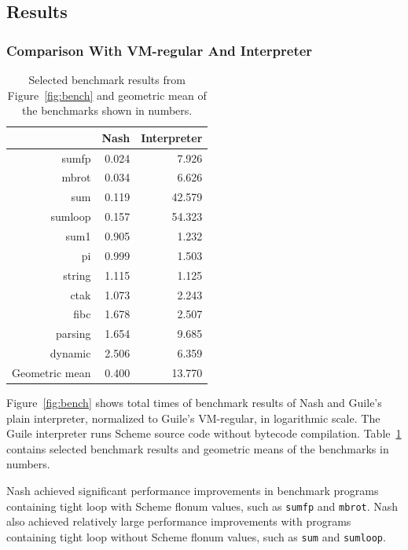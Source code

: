 \documentclass[preprint, 10pt]{sigplanconf}
\begin{document}
\subsection{Results}
\label{sec:results}

\subsubsection{Comparison With VM-regular And Interpreter}
\label{sec:guilecomp}

\begin{table}
  \centering
  \begin{tabular}{rrr}
     & Nash & Interpreter \\
    \toprule
    sumfp & 0.024 & 7.926 \\
    mbrot & 0.034 & 6.626 \\
    sum & 0.119 & 42.579 \\
    sumloop & 0.157 & 54.323 \\
    \midrule
    sum1 & 0.905 & 1.232 \\
    pi & 0.999 & 1.503 \\
    string & 1.115 & 1.125 \\
    \midrule
    ctak & 1.073 & 2.243 \\
    fibc & 1.678 & 2.507 \\
    parsing & 1.654 & 9.685 \\
    dynamic & 2.506 & 6.359 \\
    \midrule
    Geometric mean & 0.400 & 13.770 \\
  \end{tabular}
  \caption{Selected benchmark results from
    Figure~\hyperref[fig:bench]{\ref{fig:bench}} and geometric mean of the
    benchmarks shown in numbers.}
\label{tab:compguile}
\end{table}

Figure~\ref{fig:bench} shows total times of benchmark results of Nash and
Guile's plain interpreter, normalized to Guile's VM-regular, in logarithmic
scale.  The Guile interpreter runs Scheme source code without bytecode
compilation.  Table~\hyperref[tab:compguile]{\ref{tab:compguile}} contains
selected benchmark results and geometric means of the benchmarks in numbers.

Nash achieved significant performance improvements in benchmark programs
containing tight loop with Scheme flonum values, such as \texttt{sumfp} and
\texttt{mbrot}.  Nash also achieved relatively large performance improvements
with programs containing tight loop without Scheme flonum values, such as
\texttt{sum} and \texttt{sumloop}.
\end{document}
